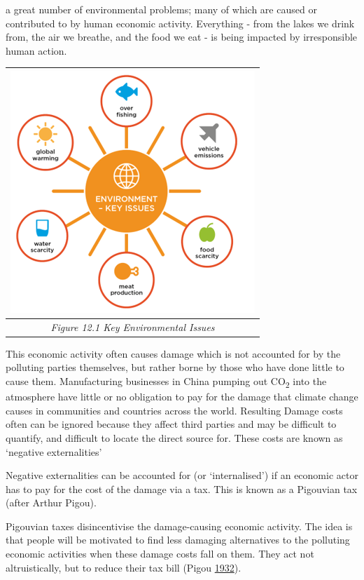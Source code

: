 \documentclass[]{tufte-handout}
\begin{document}
 a great number of environmental
problems; many of which are caused or contributed to by human economic
activity. Everything - from the lakes we drink from, the air we breathe,
and the food we eat - is being impacted by irresponsible human action.

\begin{longtable}[]{@{}c@{}}
\toprule
\includegraphics{OtherPictures/EnvironmentalIssues.png}\tabularnewline
\midrule
\endhead
\emph{Figure 12.1 Key Environmental Issues}\tabularnewline
\bottomrule
\end{longtable}

This economic activity often causes damage which is not accounted for by
the polluting parties themselves, but rather borne by those who have
done little to cause them. Manufacturing businesses in China pumping out
CO\textsubscript{2} into the atmosphere have little or no obligation to
pay for the damage that climate change causes in communities and
countries across the world. Resulting Damage costs often can be ignored
because they affect third parties and may be difficult to quantify, and
difficult to locate the direct source for. These costs are known as
`negative externalities'

Negative externalities can be accounted for (or `internalised') if an
economic actor has to pay for the cost of the damage via a tax. This is
known as a Pigouvian tax (after Arthur Pigou).

Pigouvian taxes disincentivise the damage-causing economic activity. The
idea is that people will be motivated to find less damaging alternatives
to the polluting economic activities when these damage costs fall on
them. They act not altruistically, but to reduce their tax bill (Pigou
\protect\hyperlink{ref-Pigou1932}{1932}).
\end{document}
